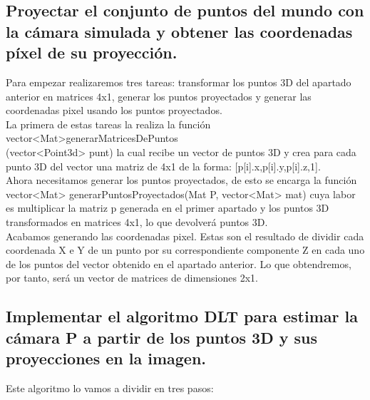 \subsection{Proyectar el conjunto de puntos del mundo con la cámara simulada y obtener las coordenadas píxel de su proyección.}

Para empezar  realizaremos tres tareas: transformar los puntos 3D del apartado anterior en matrices 4x1, generar los puntos proyectados y generar las coordenadas pixel  usando los puntos proyectados.\\

La primera de estas tareas la realiza la función vector<Mat>generarMatricesDePuntos\\(vector<Point3d> punt) la cual recibe un vector de puntos 3D y crea para cada punto 3D del vector una matriz de 4x1 de la forma: [p[i].x,p[i].y,p[i].z,1].\\

Ahora necesitamos generar los puntos proyectados, de esto se encarga la función  vector<Mat> generarPuntosProyectados(Mat P, vector<Mat> mat) cuya labor es multiplicar la matriz  p  generada en el primer apartado y los puntos 3D transformados en matrices 4x1, lo que devolverá puntos 3D.\\

Acabamos generando las coordenadas pixel. Estas son el resultado de dividir cada coordenada X e Y  de un punto por su correspondiente componente Z en cada uno de los puntos del vector obtenido en el apartado anterior. Lo que obtendremos, por tanto, será un vector  de matrices de dimensiones 2x1.\\


	
\subsection{Implementar el algoritmo DLT para estimar la cámara P a partir de los puntos 3D y sus proyecciones en la imagen.}

Este algoritmo lo vamos a dividir en tres pasos:

